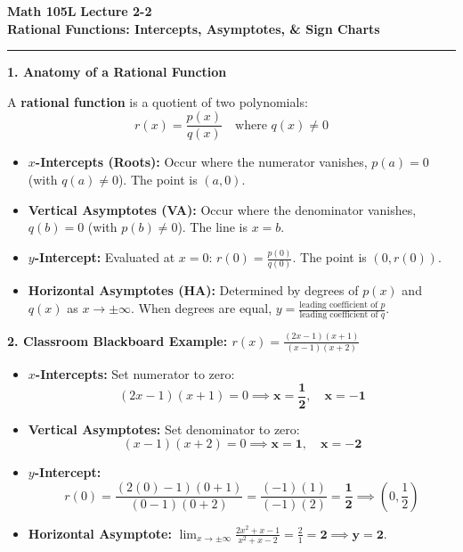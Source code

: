 \documentclass[10.5pt]{article}
\begin{document}
\noindent \textbf{\large Math 105L} \hfill \textbf{\large Lecture 2-2}\\[1pt]
{\textbf{\Large Rational Functions: Intercepts, Asymptotes, \& Sign Charts}}\\[-5pt]
\rule{\textwidth}{1.2pt}

\vspace{0.03in}

\textbf{\large 1. Anatomy of a Rational Function}

A \textbf{rational function} is a quotient of two polynomials:
\[
  r(x) = \frac{p(x)}{q(x)} \quad \text{where } q(x) \ne 0
\]
\begin{tcolorbox}[colback=boxbg, colframe=boxframe, boxrule=0.8pt, arc=3pt, left=8pt, right=8pt, top=4pt, bottom=4pt]
\begin{itemize}[leftmargin=1.2em, topsep=1pt, itemsep=3pt]
  \item \textbf{$x$-Intercepts (Roots):} Occur where the numerator vanishes, $p(a) = 0$ (with $q(a) \ne 0$). The point is $(a, 0)$.
  \item \textbf{Vertical Asymptotes (VA):} Occur where the denominator vanishes, $q(b) = 0$ (with $p(b) \ne 0$). The line is $x = b$.
  \item \textbf{$y$-Intercept:} Evaluated at $x = 0$: $r(0) = \frac{p(0)}{q(0)}$. The point is $(0, r(0))$.
  \item \textbf{Horizontal Asymptotes (HA):} Determined by degrees of $p(x)$ and $q(x)$ as $x \to \pm\infty$. When degrees are equal, $y = \frac{\text{leading coefficient of } p}{\text{leading coefficient of } q}$.
\end{itemize}
\end{tcolorbox}

\vspace{0.03in}

\textbf{\large 2. Classroom Blackboard Example: $r(x) = \frac{(2x - 1)(x + 1)}{(x - 1)(x + 2)}$}

\begin{itemize}[leftmargin=1.2em, topsep=1pt, itemsep=3pt]
  \item \textbf{$x$-Intercepts:} Set numerator to zero:
  \[
    (2x - 1)(x + 1) = 0 \implies \mathbf{x = \frac{1}{2}}, \quad \mathbf{x = -1}
  \]
  \item \textbf{Vertical Asymptotes:} Set denominator to zero:
  \[
    (x - 1)(x + 2) = 0 \implies \mathbf{x = 1}, \quad \mathbf{x = -2}
  \]
  \item \textbf{$y$-Intercept:}
  \[
    r(0) = \frac{(2(0) - 1)(0 + 1)}{(0 - 1)(0 + 2)} = \frac{(-1)(1)}{(-1)(2)} = \mathbf{\frac{1}{2}} \implies \left(0, \frac{1}{2}\right)
  \]
  \item \textbf{Horizontal Asymptote:} $\lim_{x\to\pm\infty}\frac{2x^2 + x - 1}{x^2 + x - 2} = \frac{2}{1} = \mathbf{2} \implies \mathbf{y = 2}$.
\end{itemize}
\end{document}
